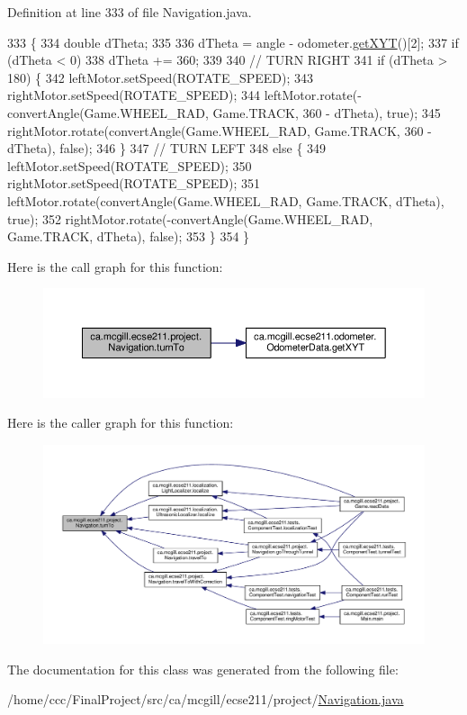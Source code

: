 Definition at line 333 of file Navigation.\+java.


\begin{DoxyCode}
333                                                 \{
334     \textcolor{keywordtype}{double} dTheta;
335 
336     dTheta = angle - odometer.\hyperlink{classca_1_1mcgill_1_1ecse211_1_1odometer_1_1_odometer_data_a8f40f0264c68f0cbed4fff1723ae7863}{getXYT}()[2];
337     \textcolor{keywordflow}{if} (dTheta < 0)
338       dTheta += 360;
339 
340     \textcolor{comment}{// TURN RIGHT}
341     \textcolor{keywordflow}{if} (dTheta > 180) \{
342       leftMotor.setSpeed(ROTATE\_SPEED);
343       rightMotor.setSpeed(ROTATE\_SPEED);
344       leftMotor.rotate(-convertAngle(Game.WHEEL\_RAD, Game.TRACK, 360 - dTheta), \textcolor{keyword}{true});
345       rightMotor.rotate(convertAngle(Game.WHEEL\_RAD, Game.TRACK, 360 - dTheta), \textcolor{keyword}{false});
346     \}
347     \textcolor{comment}{// TURN LEFT}
348     \textcolor{keywordflow}{else} \{
349       leftMotor.setSpeed(ROTATE\_SPEED);
350       rightMotor.setSpeed(ROTATE\_SPEED);
351       leftMotor.rotate(convertAngle(Game.WHEEL\_RAD, Game.TRACK, dTheta), \textcolor{keyword}{true});
352       rightMotor.rotate(-convertAngle(Game.WHEEL\_RAD, Game.TRACK, dTheta), \textcolor{keyword}{false});
353     \}
354   \}
\end{DoxyCode}
Here is the call graph for this function\+:
\nopagebreak
\begin{figure}[H]
\begin{center}
\leavevmode
\includegraphics[width=350pt]{classca_1_1mcgill_1_1ecse211_1_1project_1_1_navigation_a3bbe0645f2b3b3d0986b4a707fb5a00c_cgraph}
\end{center}
\end{figure}
Here is the caller graph for this function\+:
\nopagebreak
\begin{figure}[H]
\begin{center}
\leavevmode
\includegraphics[width=350pt]{classca_1_1mcgill_1_1ecse211_1_1project_1_1_navigation_a3bbe0645f2b3b3d0986b4a707fb5a00c_icgraph}
\end{center}
\end{figure}


The documentation for this class was generated from the following file\+:\begin{DoxyCompactItemize}
\item 
/home/ccc/\+Final\+Project/src/ca/mcgill/ecse211/project/\hyperlink{_navigation_8java}{Navigation.\+java}\end{DoxyCompactItemize}
